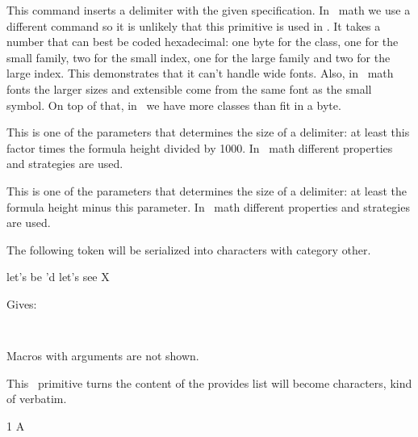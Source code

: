This command inserts a delimiter with the given specification. In \OPENTYPE\ math
we use a different command so it is unlikely that this primitive is used in
\LUAMETATEX. It takes a number that can best be coded hexadecimal: one byte for
the class, one for the small family, two for the small index, one for the large
family and two for the large index. This demonstrates that it can't handle wide
fonts. Also, in \OPENTYPE\ math fonts the larger sizes and extensible come from
the same font as the small symbol. On top of that, in \LUAMETATEX\ we have more
classes than fit in a byte.

\stopoldprimitive

\startoldprimitive[title={\prm {delimiterfactor}}][obsolete=yes]

This is one of the parameters that determines the size of a delimiter: at least
this factor times the formula height divided by 1000. In \OPENTYPE\ math
different properties and strategies are used.

\stopoldprimitive

\startoldprimitive[title={\prm {delimitershortfall}}][obsolete=yes]

This is one of the parameters that determines the size of a delimiter: at least
the formula height minus this parameter. In \OPENTYPE\ math different properties
and strategies are used.

\stopoldprimitive

\startnewprimitive[title={\prm {detokened}}]

The following token will be serialized into characters with category \quote
{other}.

\startbuffer
{}
\def\foo{let's be \relax'd}
\def\oof#1{let's see #1}
\detokened{}
\detokened\foo
\detokened\oof
\detokened\setbox
\detokened X
\stopbuffer

\typebuffer

Gives:

\startlines\tt
\getbuffer
\stoplines

Macros with arguments are not shown.

\stopnewprimitive

\startoldprimitive[title={\prm {detokenize}}]

This \ETEX\ primitive turns the content of the provides list will become
characters, kind of verbatim.

\startbuffer
\expandafter\let\expandafter\temp\detokenize{1} \meaning\temp
\expandafter\let\expandafter\temp\detokenize{A} \meaning\temp
\stopbuffer

